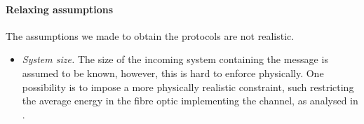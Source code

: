 \documentclass{theoretics}
\begin{document}
\paragraph{Relaxing assumptions} The assumptions we made to obtain the protocols are not realistic.
\begin{itemize}
  \item \emph{System size.} The size of the incoming system containing the
        message is assumed to be known, however, this is hard to enforce physically.
        One possibility is to impose a more physically realistic constraint, such restricting the average energy in the fibre optic implementing the channel, as analysed in \cite{Himbeeck2017}.




\end{itemize}
\end{document}
